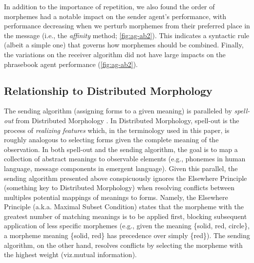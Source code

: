In addition to the importance of repetition, we also found the order of morphemes had a notable impact on the sender agent's performance, with performance decreasing when we perturb morphemes from their preferred place in the message (i.e., the \emph{affinity} method; \cref{fig:ag-ab2}).
This indicates a syntactic rule (albeit a simple one) that governs how morphemes should be combined.
Finally, the variations on the receiver algorithm did not have large impacts on the phrasebook agent performance (\cref{fig:ag-ab2}).

\subsection{Relationship to Distributed Morphology}

The sending algorithm (assigning forms to a given meaning) is paralleled by \emph{spell-out} from Distributed Morphology \citep{halle1993dm}.
In Distributed Morphology, spell-out is the process of \emph{realizing features} which, in the terminology used in this paper, is roughly analogous to selecting forms given the complete meaning of the observation.
In both spell-out and the sending algorithm, the goal is to map a collection of abstract meanings to observable elements (e.g., phonemes in human language, message components in emergent language).
Given this parallel, the sending algorithm presented above conspicuously ignores the Elsewhere Principle \citep{Anderson_1992} (something key to Distributed Morphology) when resolving conflicts between multiples potential mappings of meanings to forms.
Namely, the Elsewhere Principle (a.k.a. Maximal Subset Condition) states that the morpheme with the greatest number of matching meanings is to be applied first, blocking subsequent application of less specific morphemes (e.g., given the meaning \{solid, red, circle\}, a morpheme meaning \{solid, red\} has precedence over simply \{red\}).
The sending algorithm, on the other hand, resolves conflicts by selecting the morpheme with the highest weight (viz.\@ mutual information).


